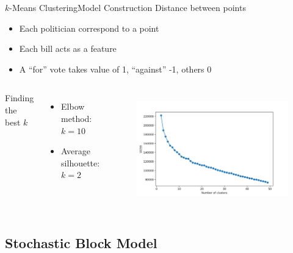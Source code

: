 \documentclass[xcolor=dvipsnames]{beamer}
\begin{document}
\begin{frame}{$k$-Means Clustering}{Model Construction}
  Distance between points
  \begin{itemize}
    \item Each politician correspond to a point
    \item Each bill acts as a feature
    \item A ``for'' vote takes value of 1, ``against'' -1, others 0
  \end{itemize}

  \begin{columns}
  Finding the best $k$
  \begin{itemize}
    \item Elbow method: $k=10$
    \item Average silhouette: $k=2$
  \end{itemize}

  \begin{figure}[H]
    \includegraphics[width=\linewidth]{k_means_wcss}
    \label{Comparison:fig:k_means_wcss}
  \end{figure}
  \end{columns}
\end{frame}


\subsection{Stochastic Block Model}
\end{document}
